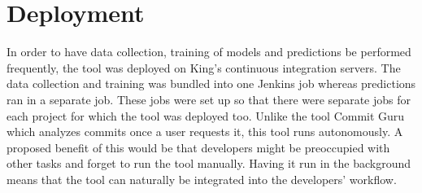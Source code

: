 \documentclass[../main.tex]{subfiles}
\begin{document}
\section{Deployment}

In order to have data collection, training of models and predictions be performed frequently, the tool was deployed on King's continuous integration servers. The data collection and training was bundled into one Jenkins job whereas predictions ran in a separate job. These jobs were set up so that there were separate jobs for each project for which the tool was deployed too. Unlike the tool Commit Guru which analyzes commits once a user requests it, this tool runs autonomously. A proposed benefit of this would be that developers might be preoccupied with other tasks and forget to run the tool manually. Having it run in the background means that the tool can naturally be integrated into the developers' workflow. 
\end{document}

